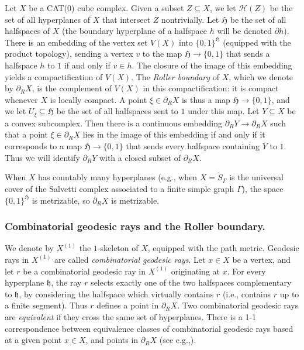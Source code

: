 \documentclass[11pt]{article}
\newcommand{\ie}{i.e.,\xspace}
\newcommand{\eg}{e.g.,\xspace}
\numberwithin{equation}{section}
\let\mathcal\mathscr
\theoremstyle{plain}
\theoremstyle{definition}
\newcommand{\calh}{\mathcal{H}}
\begin{document}
Let $X$ be a CAT(0) cube complex. Given a subset $Z\subseteq X$, we let $\calh(Z)$ be the set of all hyperplanes of $X$ that intersect $Z$ nontrivially. Let $\mathfrak{H}$ be the set of all halfspaces of $X$ (the boundary hyperplane of a halfspace $h$ will be denoted $\partial h$). There is an embedding of the vertex set $V(X)$ into $\{0,1\}^{\mathfrak{H}}$ (equipped with the product topology), sending a vertex $v$ to the map $\mathfrak{H}\to\{0,1\}$ that sends a halfspace $h$ to $1$ if and only if $v\in h$. The closure of the image of this embedding yields a compactification of $V(X)$. The \emph{Roller boundary} of $X$, which we denote by $\partial_RX$, is the complement of $V(X)$ in this compactification: it is compact whenever $X$ is locally compact. A point $\xi\in\partial_R X$ is thus a map $\mathfrak{H}\to\{0,1\}$, and we let $U_\xi\subseteq\mathfrak{H}$ be the set of all halfspaces sent to $1$ under this map. Let $Y\subseteq X$ be a convex subcomplex. Then there is a continuous embedding $\partial_RY\to \partial_R X$ such that a point $\xi\in\partial_R X$ lies in the image of this embedding if and only if it corresponds to a map $\mathfrak{H}\to\{0,1\}$ that sends every halfspace containing $Y$ to $1$. Thus we will identify $\partial_R Y$ with a closed subset of $\partial_R X$.

When $X$ has countably many hyperplanes (\eg when $X=\widetilde{S}_\Gamma$ is the universal cover of the Salvetti complex associated to a finite simple graph $\Gamma$), the space $\{0,1\}^{\mathfrak{H}}$ is metrizable, so $\partial_RX$ is metrizable.

\subsubsection*{Combinatorial geodesic rays and the Roller boundary.} We denote by $X^{(1)}$ the $1$\nobreakdash-skele\-ton of $X$, equipped with the path metric. Geodesic rays in $X^{(1)}$ are called \emph{combinatorial geodesic rays}. Let $x\in X$ be a vertex, and let $r$ be a combinatorial geodesic ray in $X^{(1)}$ originating at $x$. For every hyperplane $\mathfrak{h}$, the ray $r$ selects exactly one of the two halfspaces complementary to $\mathfrak{h}$, by considering the halfspace which virtually contains $r$ (\ie contains $r$ up to a finite segment). Thus $r$ defines a point in $\partial_R X$. Two combinatorial geodesic rays are \emph{equivalent} if they cross the same set of hyperplanes. There is a 1-1 correspondence between equivalence classes of combinatorial geodesic rays based at a given point $x\in X$, and points in $\partial_R X$ (see \eg \cite[\S A.2]{genevois2020contracting}).
\end{document}
